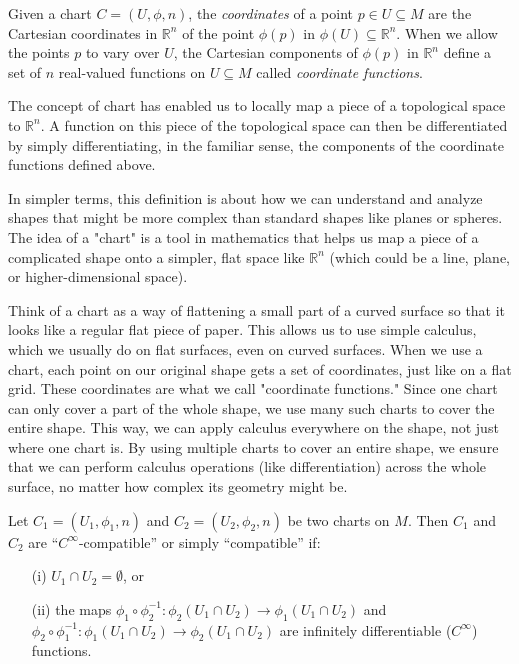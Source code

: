 \documentclass{article}
\begin{document}
\begin{theorem}
    
Given a chart \( C = (U, \phi, n) \), the \textit{coordinates} of a point \( p \in U \subseteq M \) are the Cartesian coordinates in \( \mathbb{R}^n \) of the point \( \phi(p) \) in \( \phi(U) \subseteq \mathbb{R}^n \). When we allow the points \( p \) to vary over \( U \), the Cartesian components of \( \phi(p) \) in \( \mathbb{R}^n \) define a set of \( n \) real-valued functions on \( U \subseteq M \) called \textit{coordinate functions}.
    
\end{theorem}

The concept of chart has enabled us to locally map a piece of a topological space to \( \mathbb{R}^n \). A function on this piece of the topological space can then be differentiated by simply differentiating, in the familiar sense, the components of the coordinate functions defined above.

In simpler terms, this definition is about how we can understand and analyze shapes that might be more complex than standard shapes like planes or spheres. The idea of a "chart" is a tool in mathematics that helps us map a piece of a complicated shape onto a simpler, flat space like \(\mathbb{R}^n\) (which could be a line, plane, or higher-dimensional space). 

Think of a chart as a way of flattening a small part of a curved surface so that it looks like a regular flat piece of paper. This allows us to use simple calculus, which we usually do on flat surfaces, even on curved surfaces. When we use a chart, each point on our original shape gets a set of coordinates, just like on a flat grid. These coordinates are what we call "coordinate functions." Since one chart can only cover a part of the whole shape, we use many such charts to cover the entire shape. This way, we can apply calculus everywhere on the shape, not just where one chart is. By using multiple charts to cover an entire shape, we ensure that we can perform calculus operations (like differentiation) across the whole surface, no matter how complex its geometry might be. 

\begin{theorem}
Let \( C_1 = (U_1, \phi_1, n) \) and \( C_2 = (U_2, \phi_2, n) \) be two charts on \( M \). Then \( C_1 \) and \( C_2 \) are ``\(C^\infty\)-compatible'' or simply ``compatible'' if:
\begin{enumerate}
    \item[(i)] \( U_1 \cap U_2 = \emptyset \), or
    \item[(ii)] the maps \( \phi_1 \circ \phi_2^{-1} : \phi_2(U_1 \cap U_2) \rightarrow \phi_1(U_1 \cap U_2) \) and \( \phi_2 \circ \phi_1^{-1} : \phi_1(U_1 \cap U_2) \rightarrow \phi_2(U_1 \cap U_2) \) are infinitely differentiable (\( C^\infty \)) functions.
\end{enumerate}    
\end{theorem}
\end{document}
